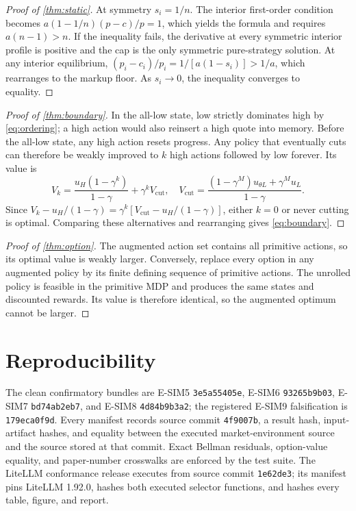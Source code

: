 \documentclass[11pt]{article}
\newcommand{\1}{\mathbf{1}}
\begin{document}
\begin{proof}[Proof of \cref{thm:static}]
At symmetry $s_i=1/n$.  The interior first-order condition becomes
$a(1-1/n)(p-c)/p=1$, which yields the formula and requires
$a(n-1)>n$.  If the inequality fails, the derivative at every symmetric
interior profile is positive and the cap is the only symmetric pure-strategy
solution.
At any interior equilibrium,
$(p_i-c_i)/p_i=1/[a(1-s_i)]>1/a$, which rearranges to the markup floor.
As $s_i\to0$, the inequality converges to equality.
\end{proof}

\begin{proof}[Proof of \cref{thm:boundary}]
In the all-low state, low strictly dominates high by
\cref{eq:ordering}; a high action would also reinsert a high quote into memory.
Before the all-low state, any high action resets progress.  Any policy that
eventually cuts can therefore be weakly improved to $k$ high actions followed
by low forever.  Its value is
\[
  V_k=\frac{u_H(1-\gamma^k)}{1-\gamma}+\gamma^kV_{\mathrm{cut}},
  \quad
  V_{\mathrm{cut}}=
  \frac{(1-\gamma^M)u_{\theta L}+\gamma^Mu_L}{1-\gamma}.
\]
Since $V_k-u_H/(1-\gamma)=\gamma^k[V_{\mathrm{cut}}-u_H/(1-\gamma)]$,
either $k=0$ or never cutting is optimal.  Comparing these alternatives and
rearranging gives \cref{eq:boundary}.
\end{proof}

\begin{proof}[Proof of \cref{thm:option}]
The augmented action set contains all primitive actions, so its optimal value is
weakly larger.  Conversely, replace every option in any augmented policy by its
finite defining sequence of primitive actions.  The unrolled policy is feasible
in the primitive MDP and produces the same states and discounted rewards.  Its
value is therefore identical, so the augmented optimum cannot be larger.
\end{proof}

\section{Reproducibility}

The clean confirmatory bundles are E-SIM5 \texttt{3e5a55405e}, E-SIM6
\texttt{93265b9b03}, E-SIM7 \texttt{bd74ab2eb7}, and E-SIM8
\texttt{4d84b9b3a2}; the registered E-SIM9 falsification is
\texttt{179eca0f9d}.  Every manifest records source commit
\texttt{4f9007b}, a result hash, input-artifact hashes, and equality between the
executed market-environment source and the source stored at that commit.  Exact
Bellman residuals, option-value equality, and paper-number crosswalks are
enforced by the test suite.  The LiteLLM conformance release executes from
source commit \texttt{1e62de3}; its manifest pins LiteLLM 1.92.0, hashes both
executed selector functions, and hashes every table, figure, and report.



\end{document}
